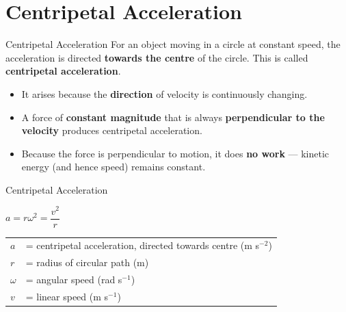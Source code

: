 \section{Centripetal Acceleration}

\begin{definitionbox}{Centripetal Acceleration}
For an object moving in a circle at constant speed, the acceleration is directed \textbf{towards the centre} of the circle. This is called \textbf{centripetal acceleration}.
\begin{itemize}[itemsep=2pt]
  \item It arises because the \textbf{direction} of velocity is continuously changing.
  \item A force of \textbf{constant magnitude} that is always \textbf{perpendicular to the velocity} produces centripetal acceleration.
  \item Because the force is perpendicular to motion, it does \textbf{no work} — kinetic energy (and hence speed) remains constant.
\end{itemize}
\end{definitionbox}

\begin{formulabox}{Centripetal Acceleration}
\begin{center}
\Large $a = r\omega^2 = \dfrac{v^2}{r}$
\end{center}
\vspace{0.3em}
\begin{tabular}{@{}ll@{}}
$a$ & = centripetal acceleration, directed towards centre (m s$^{-2}$) \\
$r$ & = radius of circular path (m) \\
$\omega$ & = angular speed (rad s$^{-1}$) \\
$v$ & = linear speed (m s$^{-1}$) \\
\end{tabular}
\end{formulabox}

\vspace{0.5em}
\begin{center}
\end{center}

